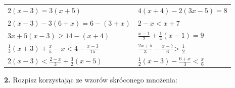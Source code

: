 \documentclass[12pt,a4paper]{article}
\theoremstyle{break}
\begin{document}
	\begin{enumerate}[a)] \begin{tabular}{p{7cm} p{7cm}} 
		\item $2(x-3)=3(x+5)$ & \vspace{0.25cm} 	\item$4(x+4)-2(3x-5)=8$ \\
		\item $2(x-3)-3(6+x)=6-(3+x)$ & \item $2-x<x+7$ \\
		\item $3x+5(x-3)\geq 14-(x+4)$ & \item $\frac{x-1}{2}+\frac{1}{4}(x-1)=9$ \\
		\item $\frac{1}{3}(x+3)+\frac{x}{5} - x < 4 - \frac{x-3}{15}$ & \item $\frac{2x+5}{3}-\frac{x-7}{6}$> $\frac{1}{2}$ \\
		\item $2(x-3)<\frac{2-x}{3}+\frac{3}{2}(x-5)$ & \item $\frac{1}{2}(x-3)-\frac{6+x}{3}<\frac{x}{6}$ \\
	\end{tabular} \end{enumerate}

			\begin{mdframed}[%
		linecolor=white,%
		innertopmargin=\topskip,
		shadowsize=0,%
		innertopmargin=5,%
		innerbottommargin=5,%
		leftmargin=10,%
		rightmargin=10,%
		backgroundcolor=gray!20,%
		innertopmargin=0pt,]
		\vspace{0.2cm}
		\textbf{2.} Rozpisz korzystając ze wzorów skróconego mnożenia:
	\end{mdframed}
	
\end{document}
